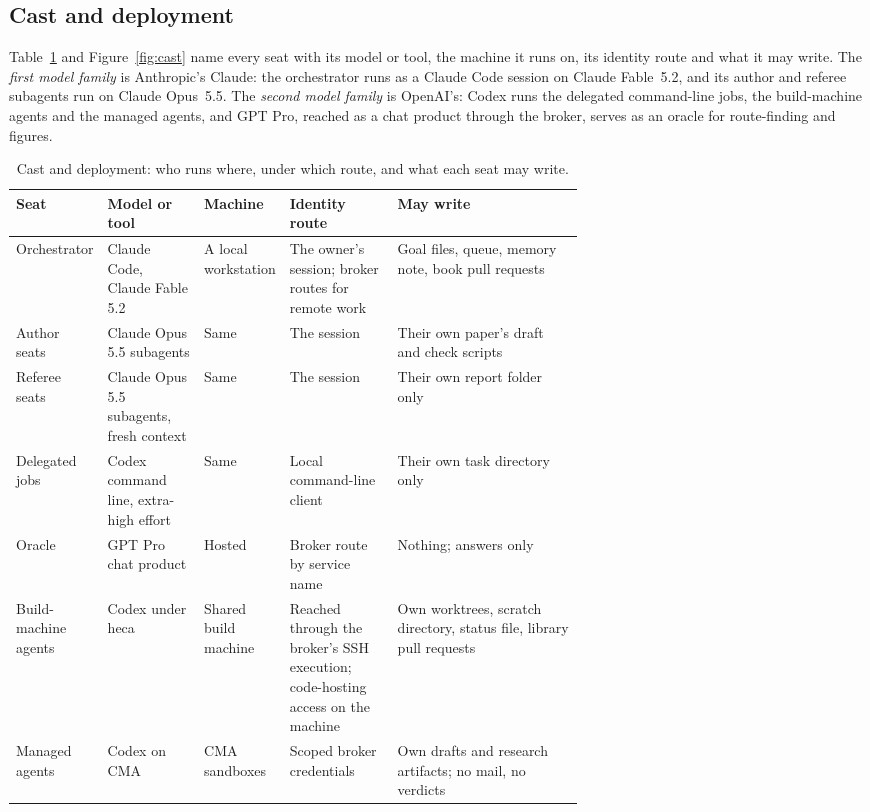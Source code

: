 \documentclass[11pt]{article}
\begin{document}
\subsection{Cast and deployment}
\label{sec:cast}
Table~\ref{tab:cast} and Figure~\ref{fig:cast} name every seat with its model
or tool, the machine it runs on, its identity route and what it may write.
The \emph{first model family} is Anthropic's Claude: the orchestrator runs as
a Claude Code session on Claude Fable~5.2, and its author and referee
subagents run on Claude Opus~5.5. The \emph{second model family} is
OpenAI's: Codex runs the delegated command-line jobs, the build-machine
agents and the managed agents, and GPT Pro, reached as a chat product through
the broker, serves as an oracle for route-finding and figures.

\begin{table}[htbp]
\centering\scriptsize
\caption{Cast and deployment: who runs where, under which route, and what each
seat may write.}
\label{tab:cast}
\begin{tabularx}{\linewidth}{@{}>{\raggedright\arraybackslash}p{0.15\linewidth}>{\raggedright\arraybackslash}p{0.17\linewidth}>{\raggedright\arraybackslash}p{0.15\linewidth}>{\raggedright\arraybackslash}p{0.19\linewidth}>{\raggedright\arraybackslash}X@{}}
\toprule
Seat & Model or tool & Machine & Identity route & May write \\
\midrule
Orchestrator & Claude Code, Claude Fable 5.2 & A local workstation & The owner's session; broker routes for remote work & Goal files, queue, memory note, book pull requests \\
Author seats & Claude Opus 5.5 subagents & Same & The session & Their own paper's draft and check scripts \\
Referee seats & Claude Opus 5.5 subagents, fresh context & Same & The session & Their own report folder only \\
Delegated jobs & Codex command line, extra-high effort & Same & Local command-line client & Their own task directory only \\
Oracle & GPT Pro chat product & Hosted & Broker route by service name & Nothing; answers only \\
Build-machine agents & Codex under heca & Shared build machine & Reached through the broker's SSH execution; code-hosting access on the machine & Own worktrees, scratch directory, status file, library pull requests \\
Managed agents & Codex on CMA & CMA sandboxes & Scoped broker credentials & Own drafts and research artifacts; no mail, no verdicts \\

\end{tabularx}
\end{table}
\end{document}

